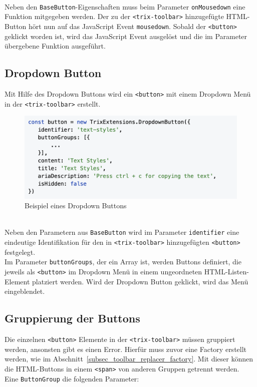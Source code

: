\mbox{}\\
Neben den \texttt{BaseButton}-Eigenschaften muss beim Parameter \texttt{onMousedown} eine Funktion mitgegeben 
werden.
Der zu der \texttt{<trix-toolbar>} hinzugefügte HTML-Button hört nun auf das JavaScript Event \texttt{mousedown}.
Sobald der \texttt{<button>} geklickt worden ist, wird das JavaScript Event ausgelöst und die im Parameter 
übergebene Funktion ausgeführt.

\subsection{Dropdown Button}
\label{dropdown_button}

Mit Hilfe des Dropdown Buttons wird ein \texttt{<button>} mit einem Dropdown Menü in der \texttt{<trix-toolbar>} 
erstellt.

\begin{figure}[H]
\begin{center}
	\includegraphics[scale=.7]{images/dropdown-button-example.png}
\end{center}
	\caption{Beispiel eines Dropdown Buttons}
\end{figure}

\mbox{}\\
Neben den Parametern aus \texttt{BaseButton} wird im Parameter \texttt{identifier} eine eindeutige Identifikation für
den in \texttt{<trix-toolbar>} hinzugefügten \texttt{<button>} festgelegt. \\
Im Parameter \texttt{buttonGroups}, der ein Array ist, werden Buttons definiert, die jeweils als \texttt{<button>} im 
Dropdown Menü in einem ungeordneten HTML-Listen-Element platziert werden. Wird der Dropdown Button geklickt, 
wird das Menü eingeblendet.

\subsection{Gruppierung der Buttons}

Die einzelnen \texttt{<button>} Elemente in der \texttt{<trix-toolbar>} müssen gruppiert werden, ansonsten gibt es 
einen Error. Hierfür muss zuvor eine Factory erstellt werden, wie im Abschnitt~\ref{subsec_toolbar_replacer_factory}. 
Mit dieser können die HTML-Buttons in einem \texttt{<span>} von anderen Gruppen getrennt werden. \\
Eine \texttt{ButtonGroup} die folgenden Parameter:

